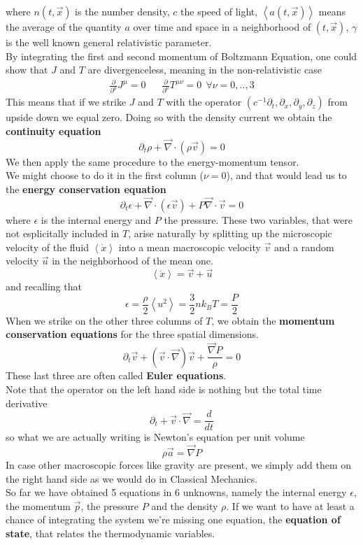 where $n(t, \vec{x})$ is the number density, $c$ the speed of light,  $\left< a(t,\vec{x}) \right>$ means the average of the quantity $a$ over time and space in a neighborhood of $(t, \vec{x})$, $\gamma$ is the well known general relativistic parameter.\\
By integrating the first and second momentum of Boltzmann Equation, one could show that $J$ and $T$ are divergenceless, meaning in the non-relativistic case
\begin{align}
\frac{\partial }{\partial^{\mu}}J^{\mu}=0 && \frac{\partial }{\partial^{\mu}}T^{\mu \nu}=0 \  \  \forall \nu =0,..,3 
\end{align}
This means that if we strike $J$ and $T$ with the operator $(c^{-1}\partial_t,\partial_x,\partial_y,\partial_z)$ from upside down we equal zero. Doing so with the density current we obtain the \textbf{continuity equation}
\begin{equation} \label{cont}
\partial_t \rho + \vec\nabla \cdot (\rho \vec{v})=0
\end{equation}
We then apply the same procedure to the energy-momentum tensor.\\
We might choose to do it in the first column ($\nu=0$), and that would lead us to the \textbf{energy conservation equation}
\begin{equation} \label{consen}
\partial_t \epsilon + \vec \nabla \cdot (\epsilon \vec{v}) + P\vec \nabla \cdot \vec{v}=0
\end{equation}
where $\epsilon$ is the internal energy and $P$ the pressure. These two variables, that were not esplicitally included in $T$, arise naturally by splitting up the microscopic velocity of the fluid $\left <  \dot{x} \right >$ into a mean macroscopic velocity $\vec{v}$ and a random velocity $\vec{u}$ in the neighborhood of the mean one. 
$$\left <  \dot{x} \right >= \vec{v}  +  \vec{u} $$
and recalling that 
$$\epsilon = \frac{\rho}{2} \left <  u^2 \right > = \frac{3}{2} n k_B T= \frac{P}{2}$$
When we strike on the other three columns of $T$, we obtain the \textbf{momentum conservation equations} for the three spatial dimensions.
\begin{equation} \label{euler}
\partial_t \vec{v} + (\vec{v} \cdot \vec \nabla) \vec{v} + \frac{\vec \nabla P}{\rho}=0
\end{equation}
These last three are often called \textbf{Euler equations}. \\
Note that the operator on the left hand side is nothing but the total time derivative
$$
\partial_t + \vec{v} \cdot \vec \nabla = \frac{d}{dt}
$$
so what we are actually writing is Newton's equation per unit volume
$$
\rho \vec{a} = \vec \nabla P
$$
In case other macroscopic forces like gravity are present, we simply add them on the right hand side as we would do in Classical Mechanics. \\
So far we have obtained 5 equations in 6 unknowns, namely the internal energy $\epsilon$, the momentum $\vec{p}$, the pressure $P$ and the density $\rho$. If we want to have at least a chance of integrating the system we're missing one equation, the \textbf{equation of state}, that relates the thermodynamic variables.


